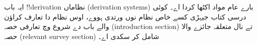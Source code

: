 \documentclass[../../../include/open-logic-chapter]{subfiles}
\begin{document}
      {}
      {}

\begin{editorial}
ایہ باب !!{derivation} نظاماں (derivation systems) بارے عام مواد اکٹھا کردا اے۔ کوئی درسی
کتاب جیہڑی کسے خاص نظام نوں ورتدی ہووے، اوس نظام دا تعارف کراؤن والے
باب دے شروع وچ تعارفی حصہ (introduction section) تے نال متعلقہ جائزے
والا حصہ (relevant survey section) شامل کر سکدی اے۔
\end{editorial}






\OLEndChapterHook
\end{document}
